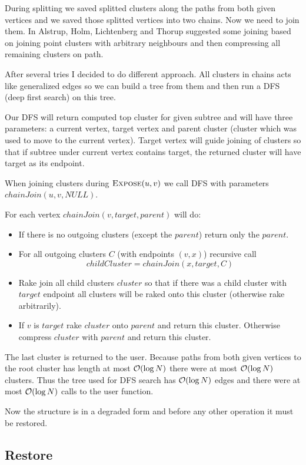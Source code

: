 During splitting we saved splitted clusters along the paths from both given
vertices and we saved those splitted vertices into two chains. Now we need to
join them. In \cite{TopTrees} Alstrup, Holm, Lichtenberg and Thorup suggested
some joining based on joining point clusters with arbitrary neighbours and then
compressing all remaining clusters on path.

After several tries I decided to do different approach. All clusters in chains
acts like generalized edges so we can build a tree from them and then run
a DFS (deep first search) on this tree.

Our DFS will return computed top cluster for given subtree and will have three
parameters: a current vertex, target vertex and parent cluster (cluster which
was used to move to the current vertex). Target vertex will guide joining of
clusters so that if subtree under current vertex contains target, the returned
cluster will have target as its endpoint.

When joining clusters during $\hbox{\sc Expose}(u,v)$ we call DFS with parameters
$chainJoin(u,v,NULL)$.

For each vertex $chainJoin(v,target,parent)$ will do:
\begin{itemize}
\item If there is no outgoing clusters (except the $parent$) return only the
$parent$.
\item For all outgoing clusters $C$ (with endpoints $(v,x)$) recursive call
$$childCluster = chainJoin(x,target,C)$$
\item Rake join all child clusters $cluster$ so that if there was a child
cluster with $target$ endpoint all clusters will be raked onto this cluster
(otherwise rake arbitrarily).
\item If $v$ is $target$ rake $cluster$ onto $parent$ and return this cluster.
Otherwise compress $cluster$ with $parent$ and return this cluster.
\end{itemize}


The last cluster is returned to the user. Because paths from both given vertices
to the root cluster has length at most ${\cal O}(\log N)$ there were at most ${\cal O}(\log
N)$ clusters. Thus the tree used for DFS search has ${\cal O}(\log N)$ edges and there
were at most ${\cal O}(\log N)$ calls to the \Join{} user function.

Now the structure is in a degraded form and before any other operation it must
be restored.

\subsection{Restore}

